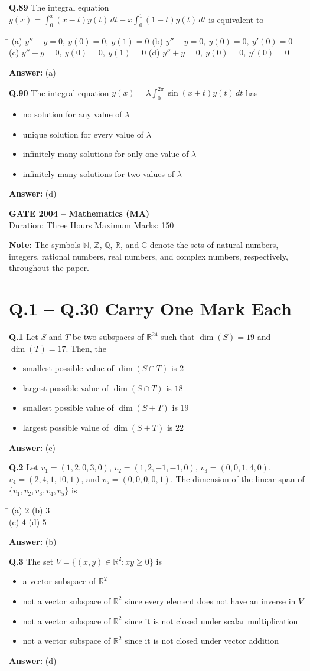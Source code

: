 \documentclass[11pt,a4paper]{article}
\newcommand{\optsfour}[4]{%
  \begin{tabbing}
    \hspace{0.48\linewidth}\=\kill
    (a) #1 \> (b) #2 \\[2pt]
    (c) #3 \> (d) #4
  \end{tabbing}%
}
\newcommand{\optslist}[4]{%
  \begin{itemize}
    \setlength{\itemsep}{2pt}\setlength{\parskip}{0pt}
    \item[(a)] #1
    \item[(b)] #2
    \item[(c)] #3
    \item[(d)] #4
  \end{itemize}%
}
\newcommand{\ans}[1]{\textbf{Answer:} #1\par\medskip}
\begin{document}
\textbf{Q.89} The integral equation $y(x) = \displaystyle\int_0^x (x - t)y(t)\,dt - x\int_0^1 (1 - t)y(t)\,dt$ is equivalent to
\optsfour{$y'' - y = 0,\ y(0) = 0,\ y(1) = 0$}{$y'' - y = 0,\ y(0) = 0,\ y'(0) = 0$}{$y'' + y = 0,\ y(0) = 0,\ y(1) = 0$}{$y'' + y = 0,\ y(0) = 0,\ y'(0) = 0$}
\ans{(a)}

\textbf{Q.90} The integral equation $y(x) = \lambda \displaystyle\int_0^{2\pi} \sin(x + t)y(t)\,dt$ has
\optslist{no solution for any value of $\lambda$}{unique solution for every value of $\lambda$}{infinitely many solutions for only one value of $\lambda$}{infinitely many solutions for two values of $\lambda$}
\ans{(d)}

\newpage


\begin{center}
  {\Large\bfseries GATE 2004 -- Mathematics (MA)}\\[4pt]
  {\small Duration: Three Hours \quad\textbar\quad Maximum Marks: 150}
\end{center}

\medskip
\textbf{Note:} The symbols $\mathbb{N}$, $\mathbb{Z}$, $\mathbb{Q}$, $\mathbb{R}$, and $\mathbb{C}$ denote the sets of natural numbers, integers, rational numbers, real numbers, and complex numbers, respectively, throughout the paper.

\section*{Q.1 -- Q.30 Carry One Mark Each}

\textbf{Q.1} Let $S$ and $T$ be two subspaces of $\mathbb{R}^{24}$ such that $\dim(S) = 19$ and $\dim(T) = 17$. Then, the
\optslist{smallest possible value of $\dim(S \cap T)$ is $2$}{largest possible value of $\dim(S \cap T)$ is $18$}{smallest possible value of $\dim(S + T)$ is $19$}{largest possible value of $\dim(S + T)$ is $22$}
\ans{(c)}

\textbf{Q.2} Let $v_1 = (1,2,0,3,0)$, $v_2 = (1,2,-1,-1,0)$, $v_3 = (0,0,1,4,0)$, $v_4 = (2,4,1,10,1)$, and $v_5 = (0,0,0,0,1)$. The dimension of the linear span of $\{v_1, v_2, v_3, v_4, v_5\}$ is
\optsfour{$2$}{$3$}{$4$}{$5$}
\ans{(b)}

\textbf{Q.3} The set $V = \{(x,y) \in \mathbb{R}^2 : xy \ge 0\}$ is
\optslist{a vector subspace of $\mathbb{R}^2$}{not a vector subspace of $\mathbb{R}^2$ since every element does not have an inverse in $V$}{not a vector subspace of $\mathbb{R}^2$ since it is not closed under scalar multiplication}{not a vector subspace of $\mathbb{R}^2$ since it is not closed under vector addition}
\ans{(d)}
\end{document}
